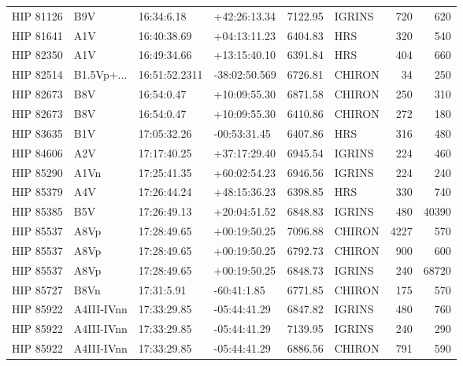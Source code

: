\documentclass{emulateapj}
\begin{document}
\begin{longtable*}{|l|lllrlrr|}
   HIP 81126 &            B9V &     16:34:6.18 &   +42:26:13.34 &  7122.95 &     IGRINS &      720 &     620 \\
   HIP 81641 &            A1V &    16:40:38.69 &   +04:13:11.23 &  6404.83 &        HRS &      320 &     540 \\
   HIP 82350 &            A1V &    16:49:34.66 &   +13:15:40.10 &  6391.84 &        HRS &      404 &     660 \\
   HIP 82514 &     B1.5Vp+... &  16:51:52.2311 &  -38:02:50.569 &  6726.81 &     CHIRON &       34 &     250 \\
   HIP 82673 &            B8V &     16:54:0.47 &   +10:09:55.30 &  6871.58 &     CHIRON &      250 &     310 \\
   HIP 82673 &            B8V &     16:54:0.47 &   +10:09:55.30 &  6410.86 &     CHIRON &      272 &     180 \\
   HIP 83635 &            B1V &    17:05:32.26 &   -00:53:31.45 &  6407.86 &        HRS &      316 &     480 \\
   HIP 84606 &            A2V &    17:17:40.25 &   +37:17:29.40 &  6945.54 &     IGRINS &      224 &     460 \\
   HIP 85290 &           A1Vn &    17:25:41.35 &   +60:02:54.23 &  6946.56 &     IGRINS &      224 &     240 \\
   HIP 85379 &            A4V &    17:26:44.24 &   +48:15:36.23 &  6398.85 &        HRS &      330 &     740 \\
   HIP 85385 &            B5V &    17:26:49.13 &   +20:04:51.52 &  6848.83 &     IGRINS &      480 &   40390 \\
   HIP 85537 &           A8Vp &    17:28:49.65 &   +00:19:50.25 &  7096.88 &     CHIRON &     4227 &     570 \\
   HIP 85537 &           A8Vp &    17:28:49.65 &   +00:19:50.25 &  6792.73 &     CHIRON &      900 &     600 \\
   HIP 85537 &           A8Vp &    17:28:49.65 &   +00:19:50.25 &  6848.73 &     IGRINS &      240 &   68720 \\
   HIP 85727 &           B8Vn &     17:31:5.91 &    -60:41:1.85 &  6771.85 &     CHIRON &      175 &     570 \\
   HIP 85922 &     A4III-IVnn &    17:33:29.85 &   -05:44:41.29 &  6847.82 &     IGRINS &      480 &     760 \\
   HIP 85922 &     A4III-IVnn &    17:33:29.85 &   -05:44:41.29 &  7139.95 &     IGRINS &      240 &     290 \\
   HIP 85922 &     A4III-IVnn &    17:33:29.85 &   -05:44:41.29 &  6886.56 &     CHIRON &      791 &     590 \\

\end{longtable*}
\end{document}
